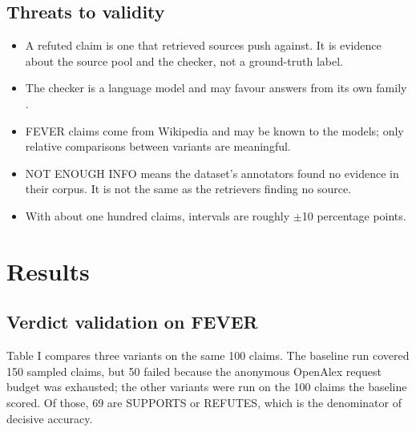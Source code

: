 \documentclass[conference]{IEEEtran}
\begin{document}
\subsection{Threats to validity}

\begin{itemize}
\item A refuted claim is one that retrieved sources push against. It is evidence about the source pool and the checker, not a ground-truth label.
\item The checker is a language model and may favour answers from its own family \cite{zheng2023}.
\item FEVER claims come from Wikipedia and may be known to the models; only relative comparisons between variants are meaningful.
\item NOT ENOUGH INFO means the dataset's annotators found no evidence in their corpus. It is not the same as the retrievers finding no source.
\item With about one hundred claims, intervals are roughly $\pm$10 percentage points.
\end{itemize}

\section{Results}
\subsection{Verdict validation on FEVER}

Table I compares three variants on the same 100 claims. The baseline run covered 150 sampled claims, but 50 failed because the anonymous OpenAlex request budget was exhausted; the other variants were run on the 100 claims the baseline scored. Of those, 69 are SUPPORTS or REFUTES, which is the denominator of decisive accuracy.
\end{document}
